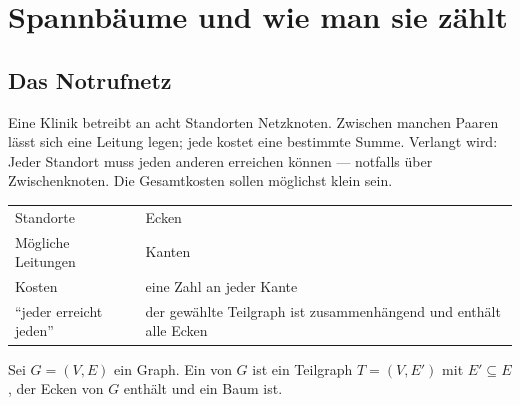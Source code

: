 \chapter{Spannbäume und wie man sie zählt}

\section{Das Notrufnetz}

Eine Klinik betreibt an acht Standorten Netzknoten. Zwischen manchen Paaren lässt sich eine Leitung legen; jede kostet eine bestimmte Summe. Verlangt wird: Jeder Standort muss jeden anderen erreichen können --- notfalls über Zwischenknoten. Die Gesamtkosten sollen möglichst klein sein.

\begin{merksatz}
\begin{center}
\renewcommand{\arraystretch}{1.5}
\begin{tabular}{@{}P{3.0cm}P{5.6cm}@{}}
\toprule
Standorte & Ecken\\
Mögliche Leitungen & Kanten\\
Kosten & eine Zahl an jeder Kante\\
\enquote{jeder erreicht jeden} & der gewählte Teilgraph ist zusammenhängend und enthält alle Ecken\\
\bottomrule
\end{tabular}
\end{center}

\begin{center}
\begin{minipage}{0.88\textwidth}
\end{minipage}
\end{center}
\end{merksatz}

\begin{definition}
Sei $G = (V,E)$ ein Graph. Ein  von $G$ ist ein Teilgraph $T = (V, E')$ mit $E' \subseteq E$, der  Ecken von $G$ enthält und ein Baum ist.
\end{definition}

